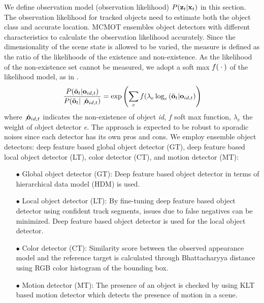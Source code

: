 \documentclass[runningheads]{llncs}
\begin{document}
We define observation model (observation likelihood) $P{\rm (}{\bf z}_{t} |{\bf x}_{t} {\rm )}$ in this section. The observation likelihood for tracked objects need to estimate both the object class and accurate location. MCMOT ensembles object detectors with different characteristics to calculate the observation likelihood accurately. Since the dimensionality of the scene state is allowed to be varied, the measure is defined as the ratio of the likelihoods of the existence and non-existence. As the likelihood of the non-existence set cannot be measured, we adopt a soft max $f{\rm (}\cdot {\rm )}$ of the likelihood model, as in \cite{Ref18}. 
\begin{equation} \label{GrindEQ__1_} 
\frac{P{\rm (}\tilde{{\bf o}}_{t} |{\bf o}_{id,t} {\rm )}}{P{\rm (}\tilde{{\bf o}}_{t} |\not {\bf o}_{id,t} {\rm )}} =\exp \left(\sum _{e}f{\rm (}\lambda _{e} \log _{e} {\rm (}\tilde{{\bf o}}_{t} |{\bf o}_{id,t} {\rm )} \right) 
\end{equation} 
where $\not {\bf o}_{id,t} $ indicates the non-existence of object \textit{id}, $f$ soft max function, $\lambda _{e} $ the weight of object detector \textit{e}. The approach is expected to be robust to sporadic noises since each detector has its own pros and cons. We employ ensemble object detectors: deep feature based global object detector (GT), deep feature based local object detector (LT), color detector (CT), and motion detector (MT):

\begin{itemize}
    \item[$\bullet$] Global object detector (GT): Deep feature based object detector \cite{Ref28} in terms of hierarchical data model (HDM) \cite{HDM} is used.
    \item[$\bullet$] Local object detector (LT): By fine-tuning deep feature based object detector using confident track segments, issues due to false negatives can be minimized. Deep feature based object detector \cite{Ref28} is used for the local object detector.
    \item[$\bullet$] Color detector (CT): Similarity score between the observed appearance model and the reference target is calculated through Bhattacharyya distance \cite{Ref17} using RGB color histogram of the bounding box.
    \item[$\bullet$] Motion detector (MT): The presence of an object is checked by using KLT based motion detector \cite{Ref26} which detects the presence of motion in a scene. 
\end{itemize}
\end{document}
